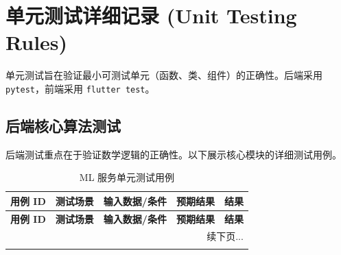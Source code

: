 \section{单元测试详细记录 (Unit Testing Rules)}

单元测试旨在验证最小可测试单元（函数、类、组件）的正确性。后端采用 \texttt{pytest}，前端采用 \texttt{flutter test}。

\subsection{后端核心算法测试}

后端测试重点在于验证数学逻辑的正确性。以下展示核心模块的详细测试用例。

\begin{longtable}{|p{2.5cm}|p{4cm}|p{4cm}|p{3.5cm}|p{1.5cm}|}
    \caption{ML 服务单元测试用例}                                                                                                                     \\
    \hline
    \textbf{用例 ID} & \textbf{测试场景}   & \textbf{输入数据/条件}                      & \textbf{预期结果}                        & \textbf{结果}             \\ \hline
    \endfirsthead
    \hline
    \textbf{用例 ID} & \textbf{测试场景}   & \textbf{输入数据/条件}                      & \textbf{预期结果}                        & \textbf{结果}             \\ \hline
    \endhead
    \hline
    \multicolumn{5}{|r|}{续下页...}                                                                                                              \\ \hline
    \endfoot
    \hline
    \endlastfoot


\end{longtable}
